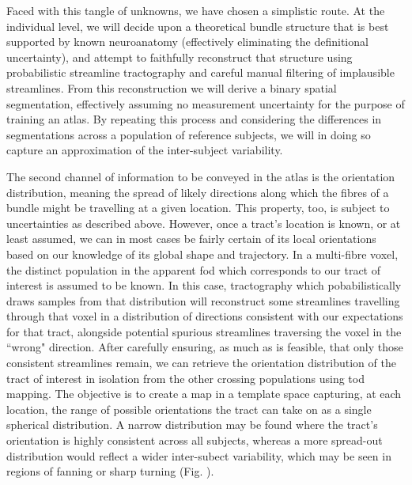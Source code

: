 Faced with this tangle of unknowns, we have chosen a simplistic route.
At the individual level, we will decide upon a theoretical bundle structure that is best supported by known neuroanatomy (effectively eliminating the definitional uncertainty), and attempt to faithfully reconstruct that structure using probabilistic streamline tractography and careful manual filtering of implausible streamlines.
From this reconstruction we will derive a binary spatial segmentation, effectively assuming no measurement uncertainty for the purpose of training an atlas.%
By repeating this process and considering the differences in segmentations across a population of reference subjects, we will in doing so capture an approximation of the inter-subject variability.

The second channel of information to be conveyed in the atlas is the orientation distribution, meaning the spread of likely directions along which the fibres of a bundle might be travelling at a given location.
This property, too, is subject to uncertainties as described above.
However, once a tract's location is known, or at least assumed, we can in most cases be fairly certain of its local orientations based on our knowledge of its global shape and trajectory.
In a multi-fibre voxel, the distinct population in the apparent \gls{fod} which corresponds to our tract of interest is assumed to be known.
In this case, tractography which pobabilistically draws samples from that distribution will reconstruct some streamlines travelling through that voxel in a distribution of directions consistent with our expectations for that tract, alongside potential spurious streamlines traversing the voxel in the ``wrong" direction.
After carefully ensuring, as much as is feasible, that only those consistent streamlines remain, we can retrieve the orientation distribution of the tract of interest in isolation from the other crossing populations using \gls{tod} mapping.
The objective is to create a map in a template space capturing, at each location, the range of possible orientations the tract can take on as a single spherical distribution.
A narrow distribution may be found where the tract's orientation is highly consistent across all subjects, whereas a more spread-out distribution would reflect a wider inter-subect variability, which may be seen in regions of fanning or sharp turning (Fig. ).

